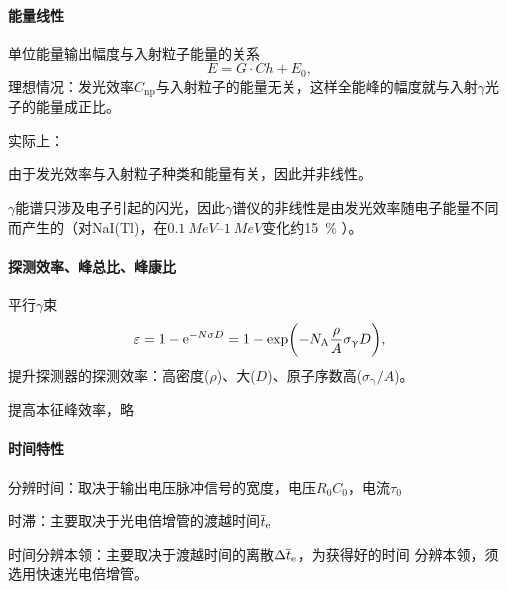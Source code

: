 \paragraph{能量线性}单位能量输出幅度与入射粒子能量的关系
\begin{equation}\label{eq:nrd-energy-calibration}
	E = G \cdot Ch + E_0,
\end{equation}
理想情况：发光效率$C_{\mathrm{np}}$与入射粒子的能量无关，这样全能峰的幅度就与入射$\gamma$光子的能量成正比。

实际上：
\begin{compactitem}
	\item 由于发光效率与入射粒子种类和能量有关，因此并非线性。
	\item $\gamma$能谱只涉及电子引起的闪光，因此$\gamma$谱仪的非线性是由发光效率随电子能量不同而产生的（对NaI(Tl)，在$\qtyrange{0.1}{1}{MeV}$变化约\qty{15}{\percent} ）。
\end{compactitem}
\paragraph{探测效率、峰总比、峰康比}平行$\gamma$束
\begin{equation}\label{eq:nrd-photon-detection-efficiency}
	\varepsilon = 1 - \mathop{}\!\mathrm{e}^{-N\sigma D} = 1 - \exp\biggl(-N_{\mathrm{A}}\frac\rho{A}\sigma_\upgamma D\biggr),
\end{equation}
提升探测器的探测效率：高密度($\rho$)、大($D$)、原子序数高($\sigma_\upgamma/A$)。

提高本征峰效率，略
\paragraph{时间特性}
\begin{compactitem}
	\item 分辨时间：取决于输出电压脉冲信号的宽度，电压$R_0C_0$，电流$\tau_0$
	\item 时滞：主要取决于光电倍增管的渡越时间$\overline{t}_{\mathrm{e}}$
	\item 时间分辨本领：主要取决于渡越时间的离散$\Delta\overline{t}_{\mathrm{e}}$，为获得好的时间	分辨本领，须选用快速光电倍增管。
\end{compactitem}



